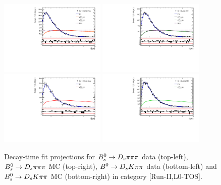 \clearpage
\begin{figure}[h]
\centering
\includegraphics[height=!,width=0.45\textwidth]{figs/Acceptance/adaptive_N4/timeAccRatioFit_norm_Run2_t0.pdf}
\includegraphics[height=!,width=0.45\textwidth]{figs/Acceptance/adaptive_N4/timeAccRatioFit_norm_mc_Run2_t0.pdf}
\includegraphics[height=!,width=0.45\textwidth]{figs/Acceptance/adaptive_N4/timeAccRatioFit_signal_B0_Run2_t0.pdf}
\includegraphics[height=!,width=0.45\textwidth]{figs/Acceptance/adaptive_N4/timeAccRatioFit_signal_mc_Run2_t0.pdf}
\caption{
\footnotesize Decay-time fit projections for 
${{B}^0_{s}}\rightarrow{\ensuremath{{D}_{s}}}{\ensuremath{\pi}}{\ensuremath{\pi}}{\ensuremath{\pi}}$ data (top-left), ${{B}^0_{s}}\rightarrow{\ensuremath{{D}_{s}}}{\ensuremath{\pi}}{\ensuremath{\pi}}{\ensuremath{\pi}}$ MC (top-right), ${{B}^0}\rightarrow{\ensuremath{{D}_{s}}}{\ensuremath{K}}{\ensuremath{\pi}}{\ensuremath{\pi}}$ data (bottom-left) 
and ${{B}^0_{s}}\rightarrow{\ensuremath{{D}_{s}}}{\ensuremath{K}}{\ensuremath{\pi}}{\ensuremath{\pi}}$ MC (bottom-right)  
in category [\textsf{Run-II},\textsf{L0-TOS}]. \\
}
\end{figure}
